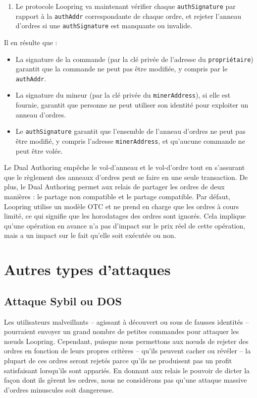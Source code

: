 \documentclass[UTF8,nofonts]{article}
\begin{document}
\begin{multicols}{2}
\begin{enumerate}
	\item Le protocole Loopring va maintenant vérifier chaque \verb|authSignature| par rapport à la \verb|authAddr| correspondante de chaque ordre, et rejeter l'anneau d'ordres si une \verb|authSignature| est manquante ou invalide.
 
\end{enumerate}

Il en résulte que :

\begin{itemize}

	\item  La signature de la commande (par la clé privée de l'adresse du \verb|propriétaire|) garantit que la commande ne peut pas être modifiée, y compris par le \verb|authAddr|.
	\item La signature du mineur (par la clé privée du \verb|minerAddress|), si elle est fournie, garantit que personne ne peut utiliser son identité pour exploiter un anneau d’ordres.
	\item Le \verb|authSignature| garantit que l'ensemble de l'anneau d’ordres ne peut pas être modifié, y compris l'adresse \verb|minerAddress|, et qu'aucune commande ne peut être volée.


\end{itemize}

Le Dual Authoring empêche le vol-d'anneau et le vol-d'ordre tout en s'assurant que le règlement des anneaux d'ordres peut se faire en une seule transaction. De plus, le Dual Authoring permet aux relais de partager les ordres de deux manières : le partage non compatible et le partage compatible. Par défaut, Loopring utilise un modèle OTC et ne prend en charge que les ordres à cours limité, ce qui signifie que les horodatages des ordres sont ignorés. Cela implique qu'une opération en avance n'a pas d'impact sur le prix réel de cette opération, mais a un impact sur le fait qu'elle soit exécutée ou non.

\section{Autres types d'attaques}

\subsection{Attaque Sybil ou DOS}
Les utilisateurs malveillants -- agissant à découvert ou sous de fausses identités -- pourraient envoyer un grand nombre de petites commandes pour attaquer les nœuds Loopring. Cependant, puisque nous permettons aux nœuds de rejeter des ordres en fonction de leurs propres critères -- qu'ils peuvent cacher ou révéler -- la plupart de ces ordres seront rejetés parce qu'ils ne produisent pas un profit satisfaisant lorsqu'ils sont appariés.  En donnant aux relais le pouvoir de dicter la façon dont ils gèrent les ordres, nous ne considérons pas qu’une attaque massive d'ordres minuscules soit dangereuse.


\end{multicols}
\end{document}
